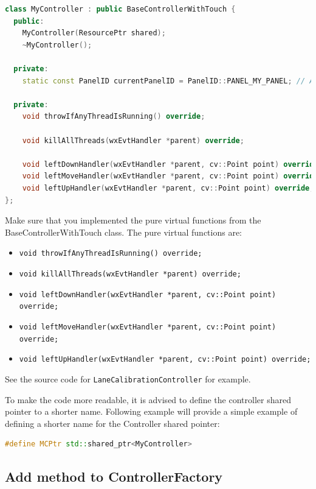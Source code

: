 \begin{lstlisting}[language=C++, caption={MyController class example}]
class MyController : public BaseControllerWithTouch {
  public:
    MyController(ResourcePtr shared);
    ~MyController();

  private:
    static const PanelID currentPanelID = PanelID::PANEL_MY_PANEL; // Add new PanelID enum here

  private:
    void throwIfAnyThreadIsRunning() override;

    void killAllThreads(wxEvtHandler *parent) override;

    void leftDownHandler(wxEvtHandler *parent, cv::Point point) override;
    void leftMoveHandler(wxEvtHandler *parent, cv::Point point) override;
    void leftUpHandler(wxEvtHandler *parent, cv::Point point) override;
};
\end{lstlisting}

Make sure that you implemented the pure virtual functions from the BaseControllerWithTouch class. The pure virtual functions are:
\begin{itemize}
      \item \texttt{void throwIfAnyThreadIsRunning() override;}
      \item \texttt{void killAllThreads(wxEvtHandler *parent) override;}
      \item \texttt{void leftDownHandler(wxEvtHandler *parent, cv::Point point) override;}
      \item \texttt{void leftMoveHandler(wxEvtHandler *parent, cv::Point point) override;}
      \item \texttt{void leftUpHandler(wxEvtHandler *parent, cv::Point point) override;}
\end{itemize}

See the source code for \texttt{LaneCalibrationController} for example.

To make the code more readable, it is advised to define the controller shared pointer to a shorter name. Following example will provide a simple example of defining a shorter name for the Controller shared pointer:

\begin{lstlisting}[language=C++, caption={Shorter name for Controller shared pointer}]
#define MCPtr std::shared_ptr<MyController>
\end{lstlisting}

\subsection{Add method to ControllerFactory}

